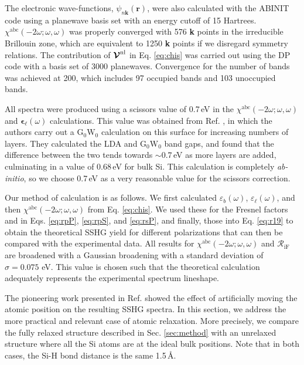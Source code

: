 \documentclass[11pt]{book}
\begin{document}
The electronic wave-functions, $\psi_{n\mathbf{k}}(\mathbf{r})$, were also calculated with the ABINIT code using a planewave basis set with an energy cutoff of 15 Hartrees. $\chi^{\mathrm{abc}}(-2\omega;\omega,\omega)$ was properly converged with 576 \textbf{k} points in the irreducible Brillouin zone, which are equivalent to 1250 \textbf{k} points if we disregard symmetry relations. The contribution of $\boldsymbol{\mathcal{\cal V}}^\mathrm{nl}$ in Eq. \eqref{eq:chis} was carried out using the DP\cite{olevanoDP} code with a basis set of 3000 planewaves. Convergence for the number of bands was achieved at 200, which includes 97 occupied bands and 103 unoccupied bands.

All spectra were produced using a scissors value of 0.7\,eV in the $\chi^{\mathrm{abc}}(-2\omega;\omega,\omega)$ and $\boldsymbol{\epsilon}_{\ell}(\omega)$ calculations. This value was obtained from Ref. \cite{liPRB10}, in which the authors carry out a $\mathrm{G}_{0}\mathrm{W}_{0}$ calculation on this surface for increasing numbers of layers. They calculated the LDA and $\mathrm{G}_{0}\mathrm{W}_{0}$ band gaps, and found that the difference between the two tends towards $\sim0.7$\,eV as more layers are added, culminating in a value of 0.68\,eV for bulk Si. This calculation is completely \emph{ab-initio}, so we choose 0.7\,eV as a very reasonable value for the scissors correction.

Our method of calculation is as follows. We first calculated $\varepsilon_{b}(\omega)$, $\varepsilon_{\ell}(\omega)$, and then $\chi^{\mathrm{abc}}(-2\omega;\omega,\omega)$ from Eq. \eqref{eq:chis}. We used these for the Fresnel factors and in Eqs. \eqref{eq:rpP}, \eqref{eq:rpS}, and \eqref{eq:rsP}, and finally, those into Eq. \eqref{eq:r19} to obtain the theoretical SSHG yield for different polarizations that can then be compared with the experimental data. All results for $\chi^{\mathrm{abc}}(-2\omega;\omega,\omega)$ and ${\mathcal R_{\mathrm{iF}}}$ are broadened with a Gaussian broadening with a standard deviation of $\sigma=0.075$ eV. This value is chosen such that the theoretical calculation adequately represents the experimental spectrum lineshape.

The pioneering work presented in Ref. \cite{mejiaPRB02} showed the effect of artificially moving the atomic position on the resulting SSHG spectra. In this section, we address the more practical and relevant case of atomic relaxation. More precisely, we compare the fully relaxed structure described in Sec. \ref{sec:method} with an unrelaxed structure where all the Si atoms are at the ideal bulk positions. Note that in both cases, the Si-H bond distance is the same 1.5\,\AA.
\end{document}
